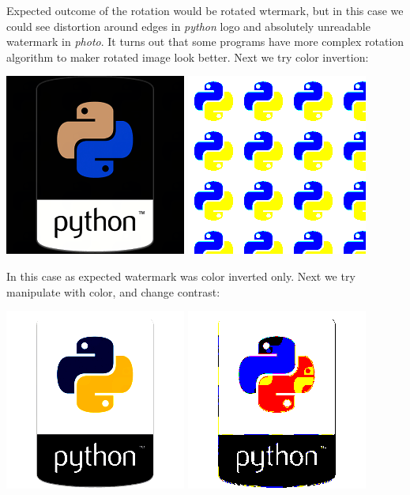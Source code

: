 \documentclass{article}
\begin{document}
    	Expected outcome of the rotation would be rotated wtermark, but in this case we could see distortion around edges in \textit{python} logo and absolutely unreadable watermark in \textit{photo}. It turns out that some programs have more complex rotation algorithm to maker rotated image look better. Next we try color invertion:

    	\includegraphics[scale=1.0]{python_lsb/watermark_python_invert.png}
    	\includegraphics[scale=1.0]{python_lsb/watermark_watermark_python_inver.png}

    	In this case as expected watermark was color inverted only. Next we try manipulate with color, and change contrast:

    	\includegraphics[scale=1.0]{python_lsb/watermark_python_colMod.png}
    	\includegraphics[scale=1.0]{python_lsb/watermark_watermark_python_colMod.png}
\end{document}
